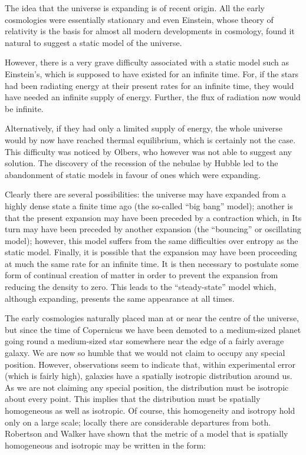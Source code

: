 The idea that the universe is expanding is of recent origin. 
All the early cosmologies were essentially stationary and even Einstein, whose theory of relativity is the basis for almost all modern developments in cosmology, found it natural to suggest a static model of the universe. 

However, there is a very grave difficulty associated with a static model such as Einstein's, which is supposed to have existed for an infinite time. 
For, if the stars had been radiating energy at their present rates for an infinite time, they would have needed an infinite supply of energy. 
Further, the flux of radiation now would be infinite. 

Alternatively, if they had only a limited supply of energy, the whole universe would by now have reached thermal equilibrium, which is certainly not the case. 
This difficulty was noticed by Olbers, who however was not able to suggest any solution. 
The discovery of the recession of the nebulae by Hubble led to the abandonment of static models in favour of ones which were expanding. 

Clearly there are several possibilities: the universe may have expanded from a highly dense state a finite time ago (the so-called ``big bang'' model); another is that the present expansion may have been preceded by a contraction which, in Its turn may have been preceded by another expansion (the ``bouncing'' or oscillating model); however, this model suffers from the same difficulties over entropy as the static model. Finally, it is possible that the expansion may have been proceeding at much the same rate for an infinite time. It is then necessary to postulate some form of continual creation of matter in order to prevent the expansion from reducing the density to zero. This leads to the ``steady-state'' model which, although expanding, presents the same appearance at all times.

The early cosmologies naturally placed man at or near the centre of the universe, but since the time of Copernicus we have been demoted to a medium-sized planet going round a medium-sized star somewhere near the edge of a fairly average galaxy. We are now so humble that we would not claim to occupy any special position. However, observations seem to indicate that, within experimental error (which is fairly high), galaxies have a spatially isotropic distribution around us. As we are not claiming any special position, the distribution must be isotropic about every point. This implies that the distribution must be spatially homogeneous as well as isotropic. Of course, this homogeneity and isotropy hold only on a large scale; locally there are considerable departures from both.\\
Robertson and Walker have shown that the metric of a model 
that is spatially homogeneous and isotropic may be written in the form:

